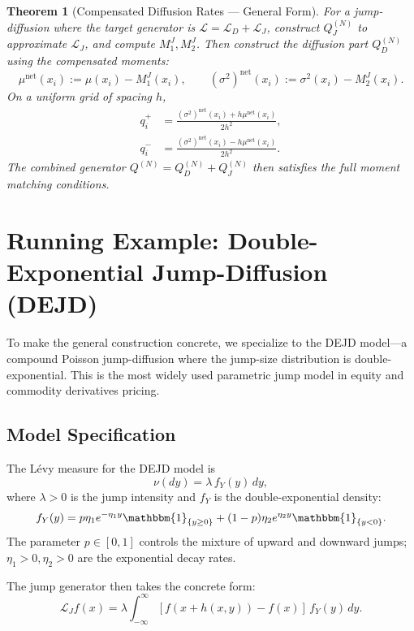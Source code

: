 \documentclass[11pt,a4paper,openany]{book}
\theoremstyle{definition}
\theoremstyle{plain}
\newtheorem{theorem}{Theorem}[chapter]
\theoremstyle{remark}
\newcommand{\1}{\mathbbm{1}}
\begin{document}
\begin{theorem}[Compensated Diffusion Rates --- General Form]
For a jump-diffusion where the target generator is $\mathcal{L} = \mathcal{L}_{D} + \mathcal{L}_{J}$, construct $Q_{J}^{(N)}$ to approximate $\mathcal{L}_{J}$, and compute $M_{1}^{J}, M_{2}^{J}$. Then construct the diffusion part $Q_{D}^{(N)}$ using the \emph{compensated} moments:
\[
\mu^{\text{net}}(x_{i}) := \mu(x_{i}) - M_{1}^{J}(x_{i}), \qquad
(\sigma^{2})^{\text{net}}(x_{i}) := \sigma^{2}(x_{i}) - M_{2}^{J}(x_{i}).
\]
On a uniform grid of spacing $h$,
\[
\boxed{\begin{aligned}
q_{i}^{+} &= \frac{(\sigma^{2})^{\text{net}}(x_{i}) + h \mu^{\text{net}}(x_{i})}{2h^{2}}, \\[8pt]
q_{i}^{-} &= \frac{(\sigma^{2})^{\text{net}}(x_{i}) - h \mu^{\text{net}}(x_{i})}{2h^{2}}.
\end{aligned}}
\]
The combined generator $Q^{(N)} = Q_{D}^{(N)} + Q_{J}^{(N)}$ then satisfies the full moment matching conditions.
\end{theorem}

\section{Running Example: Double-Exponential Jump-Diffusion (DEJD)}
\label{sec:dejd}

To make the general construction concrete, we specialize to the DEJD model---a compound Poisson jump-diffusion where the jump-size distribution is double-exponential. This is the most widely used parametric jump model in equity and commodity derivatives pricing.

\subsection{Model Specification}

The L\'{e}vy measure for the DEJD model is
\[
\nu(dy) = \lambda \, f_{Y}(y) \, dy,
\]
where $\lambda > 0$ is the jump intensity and $f_{Y}$ is the double-exponential density:
\[
f_{Y}(y) = p \eta_{1} e^{-\eta_{1} y} \1_{\{y \geq 0\}} + (1-p) \eta_{2} e^{\eta_{2} y} \1_{\{y < 0\}}.
\]
The parameter $p \in [0,1]$ controls the mixture of upward and downward jumps; $\eta_{1} > 0, \eta_{2} > 0$ are the exponential decay rates.

The jump generator then takes the concrete form:
\[
\mathcal{L}_{J} f(x) = \lambda \int_{-\infty}^{\infty} [f(x + h(x,y)) - f(x)] \, f_{Y}(y) \, dy.
\]
\end{document}
